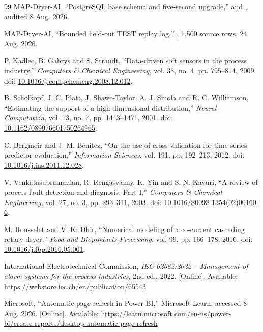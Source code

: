 \begin{thebibliography}{99}
 MAP-Dryer-AI, ``PostgreSQL base schema and five-second upgrade,''  and , audited 8 Aug. 2026.

 MAP-Dryer-AI, ``Bounded held-out TEST replay log,'' , 1,500 source rows, 24 Aug. 2026.

 P. Kadlec, B. Gabrys and S. Strandt, ``Data-driven soft sensors in the process industry,'' \emph{Computers \& Chemical Engineering}, vol. 33, no. 4, pp. 795--814, 2009. doi: \href{https://doi.org/10.1016/j.compchemeng.2008.12.012}{10.1016/j.compchemeng.2008.12.012}.

 B. Sch\"olkopf, J. C. Platt, J. Shawe-Taylor, A. J. Smola and R. C. Williamson, ``Estimating the support of a high-dimensional distribution,'' \emph{Neural Computation}, vol. 13, no. 7, pp. 1443--1471, 2001. doi: \href{https://doi.org/10.1162/089976601750264965}{10.1162/089976601750264965}.

 C. Bergmeir and J. M. Ben\'itez, ``On the use of cross-validation for time series predictor evaluation,'' \emph{Information Sciences}, vol. 191, pp. 192--213, 2012. doi: \href{https://doi.org/10.1016/j.ins.2011.12.028}{10.1016/j.ins.2011.12.028}.

 V. Venkatasubramanian, R. Rengaswamy, K. Yin and S. N. Kavuri, ``A review of process fault detection and diagnosis: Part I,'' \emph{Computers \& Chemical Engineering}, vol. 27, no. 3, pp. 293--311, 2003. doi: \href{https://doi.org/10.1016/S0098-1354(02)00160-6}{10.1016/S0098-1354(02)00160-6}.

 M. Rousselet and V. K. Dhir, ``Numerical modeling of a co-current cascading rotary dryer,'' \emph{Food and Bioproducts Processing}, vol. 99, pp. 166--178, 2016. doi: \href{https://doi.org/10.1016/j.fbp.2016.05.001}{10.1016/j.fbp.2016.05.001}.

\par\smallskip
{} International Electrotechnical Commission, \emph{IEC 62682:2022 -- Management of alarm systems for the process industries}, 2nd ed., 2022. [Online]. Available: \url{https://webstore.iec.ch/en/publication/65543}

 Microsoft, ``Automatic page refresh in Power BI,'' Microsoft Learn, accessed 8 Aug. 2026. [Online]. Available: \url{https://learn.microsoft.com/en-us/power-bi/create-reports/desktop-automatic-page-refresh}

\end{thebibliography}
\endgroup
